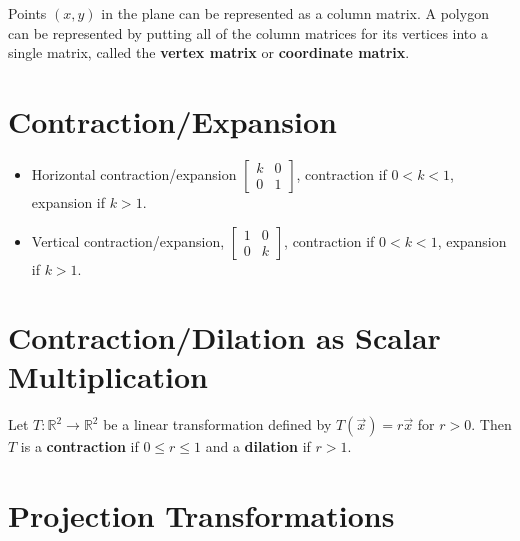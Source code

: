 \documentclass[letterpaper,12pt]{article}
\begin{document}
Points $(x,y)$ in the plane can be represented as a column matrix. A polygon can be represented by putting all of the column matrices for its vertices into a single matrix, called the \textbf{vertex matrix} or \textbf{coordinate matrix}.

\section*{Contraction/Expansion}
\begin{itemize}
    \item Horizontal contraction/expansion $\begin{bmatrix} k & 0 \\ 0 & 1 \end{bmatrix}$, contraction if $0 < k < 1$, expansion if $k > 1$.
    \item Vertical contraction/expansion, $\begin{bmatrix} 1 & 0 \\ 0 & k \end{bmatrix}$, contraction if $0 < k < 1$, expansion if $k > 1$.
\end{itemize}

\section*{Contraction/Dilation as Scalar Multiplication}
\begin{definition}
Let $T: \mathbb{R}^2 \rightarrow \mathbb{R}^2$ be a linear transformation defined by $T(\vec{x}) = r\vec{x}$ for $r > 0$. Then $T$ is a \textbf{contraction} if $0 \leq r \leq 1$ and a \textbf{dilation} if $r > 1$.
\end{definition}

\section*{Projection Transformations}
\end{document}
